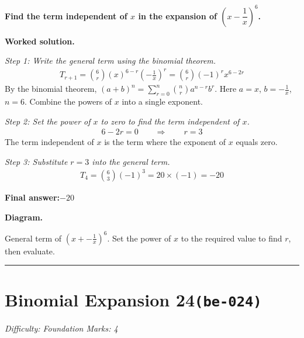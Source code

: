 \documentclass[11pt]{article}
\newcommand{\question}[1]{\par\medskip\noindent\textbf{#1}\par}
\begin{document}
\question{Find the term independent of \( x \) in the expansion of \( \left(x - \dfrac{1}{x}\right)^6 \).}

\textbf{Worked solution.}

\textit{Step 1: Write the general term using the binomial theorem.}
\[\begin{gathered}
T_{r+1} = \binom{6}{r}(x)^{6-r}\left(-\frac{1}{x}\right)^r = \binom{6}{r}(-1)^r x^{6-2r}
\end{gathered}\]
By the binomial theorem, \((a+b)^n = \sum_{r=0}^{n} \binom{n}{r} a^{n-r} b^r\). Here \(a = x\), \(b = -\frac{1}{x}\), \(n = 6\). Combine the powers of \(x\) into a single exponent.

\textit{Step 2: Set the power of \(x\) to zero to find the term independent of \(x\).}
\[\begin{gathered}
6 - 2r = 0 \quad\quad \Rightarrow \quad\quad r = 3
\end{gathered}\]
The term independent of \(x\) is the term where the exponent of \(x\) equals zero.

\textit{Step 3: Substitute \(r = 3\) into the general term.}
\[\begin{gathered}
T_4 = \binom{6}{3}(-1)^3 = 20 \times (-1) = -20
\end{gathered}\]
\begin{answerbox}
\textbf{Final answer:}\quad \(\displaystyle -20\)
\end{answerbox}
\textbf{Diagram.}

\begin{center}
\end{center}
\small General term of $\left(x+-\frac{1}{x}\right)^{6}$. Set the power of $x$ to the required value to find $r$, then evaluate.\normalsize

\medskip\hrule

\section*{Binomial Expansion 24\quad\small\texttt{(be-024)}}
\textit{Difficulty: Foundation \quad\textbar\quad Marks: 4}
\end{document}
